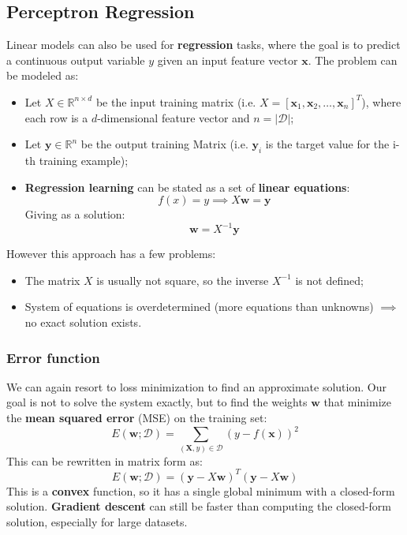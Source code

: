 \subsection{Perceptron Regression}
Linear models can also be used for \textbf{regression} tasks, where the goal is to predict a continuous output variable $y$ given an input feature vector $\boldsymbol{x}$.
The problem can be modeled as:
\begin{itemize}
    \item Let $X \in \mathbb{R}^{n \times d}$ be the input training matrix (i.e. $X = \left[ \boldsymbol{x}_1, \boldsymbol{x}_2, \ldots, \boldsymbol{x}_n \right]^T$), where each row is a $d$-dimensional feature vector and $n = |\mathcal{D}|$;
    \item Let $\boldsymbol{y} \in \mathbb{R}^n$ be the output training Matrix (i.e. $\boldsymbol{y}_i$ is the target value for the i-th training example);
    \item \textbf{Regression learning} can be stated as a set of \textbf{linear equations}:
    \begin{equation*}
        f(x) = y \implies X\boldsymbol{w} = \boldsymbol{y}
    \end{equation*}
    Giving as a solution:
    \begin{equation}
        \boldsymbol{w} = X^{-1}\boldsymbol{y}
    \end{equation}
\end{itemize}
However this approach has a few problems:
\begin{itemize}
    \item The matrix $X$ is usually not square, so the inverse $X^{-1}$ is not defined;
    \item System of equations is overdetermined (more equations than unknowns) $\implies$ no exact solution exists.
\end{itemize}

\subsubsection{Error function}
We can again resort to loss minimization to find an approximate solution.
Our goal is not to solve the system exactly, but to find the weights $\boldsymbol{w}$ that minimize the \textbf{mean squared error} (MSE) on the training set:
\begin{equation*}
    E(\boldsymbol{w}; \mathcal{D}) = \sum_{(\boldsymbol{X}, y) \in \mathcal{D}} (y - f(\boldsymbol{x}))^2
\end{equation*}
This can be rewritten in matrix form as:
\begin{equation}
    \label{eq:mse}
    E(\boldsymbol{w}; \mathcal{D}) = (\boldsymbol{y} - X\boldsymbol{w})^T (\boldsymbol{y} - X\boldsymbol{w})
\end{equation}
This is a \textbf{convex} function, so it has a single global minimum with a closed-form solution. 
\textbf{Gradient descent} can still be faster than computing the closed-form solution, especially for large datasets.

